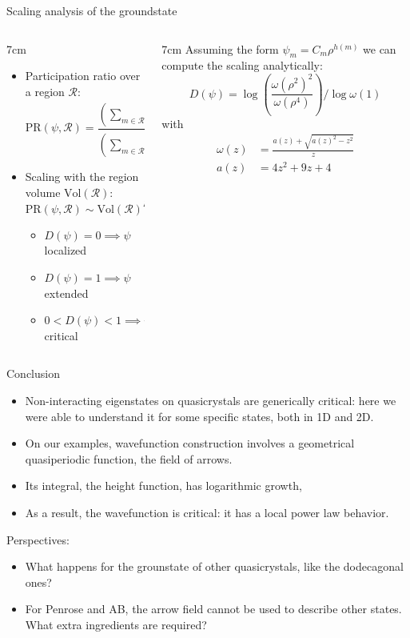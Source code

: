 \documentclass[xcolor=x11names,compress,professionalfonts, aspectratio=169]{beamer}
\renewcommand{\(}{\begin{columns}}
\renewcommand{\)}{\end{columns}}
\newcommand{\<}[1]{\begin{column}{#1}}
\renewcommand{\>}{\end{column}}
\begin{document}
\begin{frame}{Scaling analysis of the groundstate}

\begin{columns}
\<{7cm}
\begin{itemize}
	\item Participation ratio over a region $\mathcal{R}$:
	\[
		\text{PR}(\psi, \mathcal{R}) = \frac{\left( \sum_{m \in \mathcal{R}}|\psi_m|^2 \right)^2}{\left( \sum_{m\in \mathcal{R}} |\psi_m|^4 \right)^4}
	\]
	\item Scaling with the region volume $\text{Vol}(\mathcal{R})$:
	\[
		\text{PR}(\psi, \mathcal{R}) \sim \text{Vol}(\mathcal{R})^{D(\psi)}
	\]
	\begin{itemize}
		\item $D(\psi) = 0 \implies \psi$ localized
		\item $D(\psi) = 1 \implies \psi$ extended
		\item $0 < D(\psi) < 1 \implies \psi$ critical
 	\end{itemize}
\end{itemize}
\>

\<{7cm}
Assuming the form $\psi_m = C_m \rho^{h(m)}$ we can compute the scaling analytically:
\[
D(\psi) = \log\left( \frac{\omega(\rho^2)^2}{\omega(\rho^4)}\right)/\log \omega(1)
\]
with 
\begin{align*}
\omega(z) &= \frac{a(z)+\sqrt{a(z)^2 - z^2}}{z} \\
a(z) &= 4 z^2 + 9 z + 4
\end{align*}
\>
\end{columns}
\end{frame}

\begin{frame}{Conclusion}
\begin{itemize}
	\item Non-interacting eigenstates on quasicrystals are generically critical: here we were able to understand it for some specific states, both in 1D and 2D.
	\item On our examples, wavefunction construction involves a geometrical quasiperiodic function, the field of arrows.
	\item Its integral, the height function, has logarithmic growth,
	\item As a result, the wavefunction is critical: it has a local power law behavior.
\end{itemize}
Perspectives:
\begin{itemize}
	\item What happens for the grounstate of other quasicrystals, like the dodecagonal ones?
	\item For Penrose and AB, the arrow field cannot be used to describe other states. What extra ingredients are required?
\end{itemize}
\end{frame}
\end{document}
